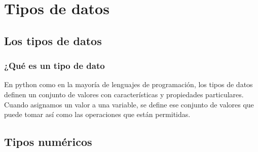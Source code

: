 \documentclass[12pt]{beamer}
\begin{document}
\section{Tipos de datos}
\subsection{Los tipos de datos}

\begin{frame}
\frametitle{¿Qué es un tipo de dato}
En python como en la mayoría de lenguajes de programación, los tipos de datos definen un conjunto de valores con características y propiedades particulares.
\\
\bigskip
\pause
Cuando asignamos un valor a una variable, se define ese conjunto de valores que puede tomar así como las operaciones que están permitidas.
\end{frame}

\subsection{Tipos numéricos}
\end{document}
